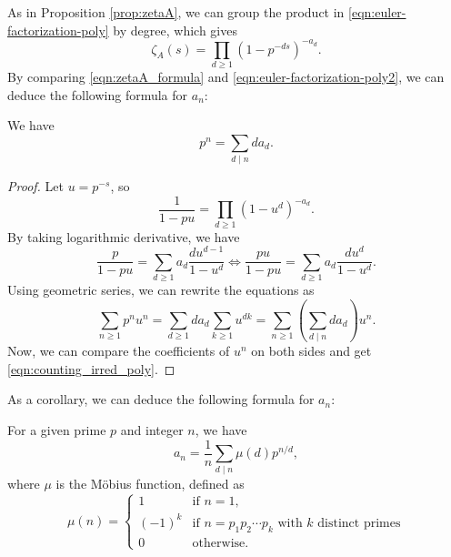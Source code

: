 As in Proposition \ref{prop:zetaA}, we can group the product in \eqref{eqn:euler-factorization-poly} by degree, which gives
\begin{equation}
    \zeta_A(s) = \prod_{d \ge 1} (1 - p^{-ds})^{-a_d}.
    \label{eqn:euler-factorization-poly2}
\end{equation}
By comparing \eqref{eqn:zetaA_formula} and \eqref{eqn:euler-factorization-poly2}, we can deduce the following formula for $a_n$:
\begin{theorem}
    We have
    \begin{equation}
        p^n = \sum_{d \mid n} d a_d.
        \label{eqn:counting_irred_poly}
    \end{equation}
\end{theorem}
\begin{proof}
    Let $u = p^{-s}$, so
    \begin{equation}
        \frac{1}{1 - pu} = \prod_{d \ge 1} (1 - u^d)^{-a_d}.
    \end{equation}
    By taking logarithmic derivative, we have
    \begin{equation}
        \frac{p}{1 - pu} = \sum_{d \ge 1} a_d \frac{d u^{d-1}}{1 - u^d} \Leftrightarrow \frac{pu}{1 - pu} = \sum_{d \ge 1} a_d \frac{d u^d}{1 - u^d}.
    \end{equation}
    Using geometric series, we can rewrite the equations as
    \begin{equation}
        \sum_{n \ge 1} p^n u^n = \sum_{d \ge 1} d a_d \sum_{k \ge 1} u^{dk} = \sum_{n \ge 1} \left(\sum_{d \mid n} d a_d\right) u^n.
    \end{equation}
    Now, we can compare the coefficients of $u^n$ on both sides and get \eqref{eqn:counting_irred_poly}.
\end{proof}

As a corollary, we can deduce the following formula for $a_n$:
\begin{corollary}
    \label{cor:counting_irred_poly}
    For a given prime $p$ and integer $n$, we have
    \begin{equation}
        a_n = \frac{1}{n} \sum_{d \mid n} \mu(d) p^{n/d},
        \label{eqn:counting_irred_poly_2}
    \end{equation}
    where $\mu$ is the M\"obius function, defined as
    \begin{equation}
        \mu(n) = \begin{cases}
            1 & \text{if } n = 1,\\
            (-1)^k & \text{if } n = p_1 p_2 \cdots p_k \text{ with } k \text{ distinct primes} \\
            0 & \text{otherwise.}
        \end{cases}
    \label{eqn:mobius}
    \end{equation}
\end{corollary}

